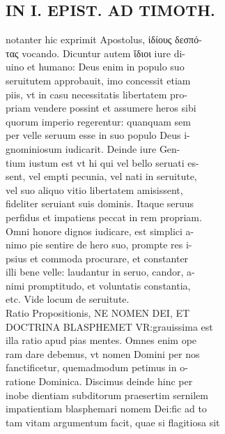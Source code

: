\documentclass{article}
\begin{document}
\begin{pages}
\section*{IN I. EPIST. AD TIMOTH. \\
                }
notanter hic exprimit Apostolus, ἱδίους δεσπό- \\
                τας vocando. Dicuntur autem ἴδιοι iure di- \\
                uino et humano: Deus enim in populo suo \\
                seruitutem approbauit, imo concessit etiam \\
                piis, vt in casu necessitatis libertatem pro- \\
                priam vendere possint et assumere heros sibi \\
                quorum imperio regerentur: quanquam sem \\
                per velle seruum esse in suo populo Deus i- \\
                gnominiosum iudicarit. Deinde iure Gen- \\
                tium iustum est vt hi qui vel bello seruati es- \\
                sent, vel empti pecunia, vel nati in seruitute, \\
                vel suo aliquo vitio libertatem amisissent, \\
                fideliter seruiant suis dominis. Itaque seruus \\
                perfidus et impatiens peccat in rem propriam. \\
                Omni honore dignos iudicare, est simplici a- \\
                nimo pie sentire de hero suo, prompte res i- \\
                psius et commoda procurare, et constanter \\
                illi bene velle: laudantur in seruo, candor, a- \\
                nimi promptitudo, et voluntatis constantia, \\
                etc. Vide locum de seruitute. \\
                Ratio Propositionis, NE NOMEN DEI, ET \\
                DOCTRINA BLASPHEMET VR:grauissima est \\
                illa ratio apud pias mentes. Omnes enim ope \\
                ram dare debemus, vt nomen Domini per nos \\
                fanctificetur, quemadmodum petimus in o- \\
                ratione Dominica. Discimus deinde hinc per \\
                inobe dientiam subditorum praesertim sernilem \\
                impatientiam blasphemari nomem Dei:fic ad to \\
                tam vitam argumentum facit, quae si flagitiosa sit \\
                

\end{pages}
\end{document}
